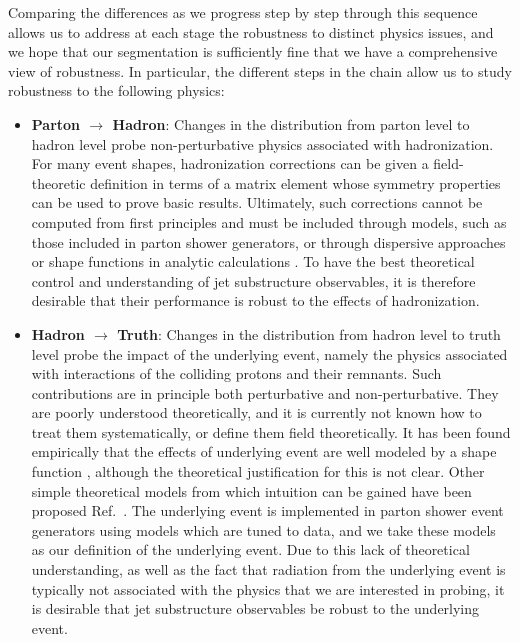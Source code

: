 \documentclass[11pt]{cernrep}
\begin{document}
Comparing the differences as we progress step by step through this sequence allows us to address at each stage the robustness to distinct physics issues, and we hope that our segmentation is sufficiently fine that we have a comprehensive view of robustness.
%
In particular, the different steps in the chain allow us to study robustness to the following physics: 
%
\begin{itemize}
%
\item {\bf Parton $\to$ Hadron}: Changes in the distribution from parton
  level to hadron level probe non-perturbative physics associated with
  hadronization.
  For many event shapes, hadronization corrections can
  be given a field-theoretic definition in terms of a matrix element
  whose symmetry properties can be used to prove basic
  results.
  Ultimately, such corrections cannot be computed
  from first principles and must be included through models, such as
  those included in parton shower generators, or through dispersive approaches or shape
  functions in analytic calculations
  \cite{Dokshitzer:1995qm,Dokshitzer:1995zt,Korchemsky:1999kt,Korchemsky:2000kp,Bosch:2004th,Hoang:2007vb,Ligeti:2008ac}.
    To have the best theoretical
  control and understanding of jet substructure observables, it is
  therefore desirable that their performance is robust to the effects
  of hadronization.
\item {\bf Hadron $\to$ Truth}: Changes in the distribution from hadron level to truth level probe the impact of the underlying event, namely the physics associated with interactions of the colliding protons and their remnants.
%
Such contributions are in principle both perturbative and non-perturbative.
%
They are poorly understood theoretically, and it is currently not known how to treat them systematically, or define them field theoretically.
%
It has been found empirically that the effects of underlying event are well modeled by a shape function \cite{Stewart:2014nna}, although the theoretical justification for this is not clear. Other simple theoretical models from which intuition can be gained have been proposed Ref.~\cite{Cacciari:2009dp}.
%
The underlying event is implemented in parton shower event generators using models which are tuned to data, and we take these models as our definition of the underlying event.
%
Due to this lack of theoretical understanding, as well as the fact that radiation from the underlying event is typically not associated with the physics that we are interested in probing, it is desirable that jet substructure observables be robust to the underlying event.

\end{itemize}
\end{document}
